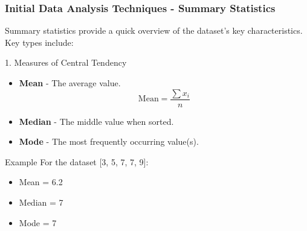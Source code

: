 \documentclass[aspectratio=169]{beamer}
\begin{document}
\begin{frame}[fragile]
    \frametitle{Initial Data Analysis Techniques - Summary Statistics}
    
    Summary statistics provide a quick overview of the dataset's key characteristics. Key types include:
    
    \begin{block}{1. Measures of Central Tendency}
        \begin{itemize}
            \item \textbf{Mean} - The average value.
              \begin{equation}
              \text{Mean} = \frac{\sum x_i}{n}
              \end{equation}
            \item \textbf{Median} - The middle value when sorted.
            \item \textbf{Mode} - The most frequently occurring value(s).
        \end{itemize}
    \end{block}
    
    \begin{block}{Example}
        For the dataset [3, 5, 7, 7, 9]:
        \begin{itemize}
            \item Mean = 6.2
            \item Median = 7
            \item Mode = 7
        \end{itemize}
    \end{block}
\end{frame}
\end{document}
